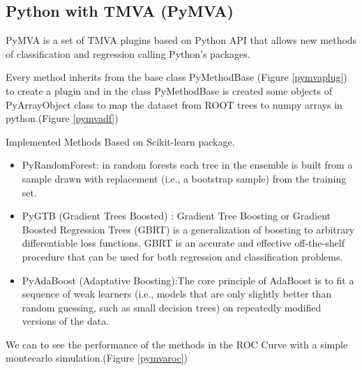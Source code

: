 \documentclass[a4paper]{jpconf}
\begin{document}
\clearpage
\subsection{Python with TMVA (PyMVA)} \label{PYMVA}
PyMVA is a set of TMVA plugins based on Python API that
allows new methods of classification and regression calling
Python's packages.

Every method inherits from the base class PyMethodBase (Figure \ref{pymvaplug})
to create a plugin and in the class PyMethodBase is created some objects of PyArrayObject class to map
the dataset from ROOT trees to numpy arrays in python.(Figure \ref{pymvadf}) 

Implemented Methods Based on Scikit-learn package\cite{pedregosa2011scikit}.
\begin{itemize}
\item PyRandomForest: in random forests each tree in the ensemble is built from a sample drawn with replacement (i.e., a bootstrap sample) from the training set.
\item PyGTB (Gradient Trees Boosted) : Gradient Tree Boosting or Gradient Boosted Regression Trees (GBRT) is a generalization of boosting to arbitrary differentiable loss
functions. GBRT is an accurate and effective off-the-shelf procedure that can be used for both regression and classification problems.
\item PyAdaBoost (Adaptative Boosting):The core principle of AdaBoost is to fit a sequence of weak learners (i.e., models that are only slightly better than random guessing, such as small
decision trees) on repeatedly modified versions of the data. 
\end{itemize}

We can to see the performance of the methods in the ROC Curve with a simple montecarlo simulation.(Figure \ref{pymvaroc})
\end{document}
